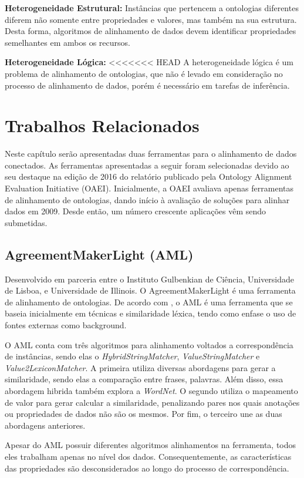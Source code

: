 \textbf{Heterogeneidade Estrutural:}
Instâncias que pertencem a ontologias diferentes diferem não somente entre propriedades e valores, mas também na sua estrutura. Desta forma, algoritmos de alinhamento de dados devem identificar propriedades semelhantes em ambos os recursos.


\textbf{Heterogeneidade Lógica:}
<<<<<<< HEAD
A heterogeneidade lógica é um problema de alinhamento de ontologias, que não é levado em consideração no processo de alinhamento de dados, porém é necessário em tarefas de inferência.

\section{Trabalhos Relacionados}
\label{cap:relacionados}
Neste capítulo serão apresentadas duas ferramentas para o alinhamento de dados conectados. As ferramentas apresentadas a seguir foram selecionadas devido ao seu destaque na edição de 2016 do relatório publicado pela Ontology Alignment Evaluation Initiative (OAEI). Inicialmente, a OAEI avaliava apenas ferramentas de alinhamento de ontologias, dando início à avaliação de soluções para alinhar dados em 2009. Desde então, um número crescente aplicações vêm sendo submetidas.

\subsection{AgreementMakerLight (AML)}
Desenvolvido em parceria entre o Instituto Gulbenkian de Ciência, Universidade de Lisboa, e Universidade de Illinois. O AgreementMakerLight é uma ferramenta de alinhamento de ontologias. De acordo com \cite{fariaoaei}, o AML é uma ferramenta que se baseia inicialmente em técnicas e similaridade léxica, tendo como enfase o uso de fontes externas como background.

O AML conta com três algoritmos para alinhamento voltados a correspondência de instâncias, sendo elas o \textit{HybridStringMatcher}, \textit{ValueStringMatcher} e \textit{Value2LexiconMatcher}. A primeira utiliza diversas abordagens para gerar a similaridade, sendo elas a comparação entre frases, palavras. Além disso, essa abordagem hibrida também explora a \textit{WordNet}. O segundo utiliza o mapeamento de valor para gerar calcular a similaridade, penalizando pares nos quais anotações ou propriedades de dados não são os mesmos. Por fim, o terceiro une as duas abordagens anteriores.

Apesar do AML possuir diferentes algoritmos alinhamentos na ferramenta, todos eles trabalham apenas no nível dos dados. Consequentemente, as características das propriedades são desconsiderados ao longo do processo de correspondência.

